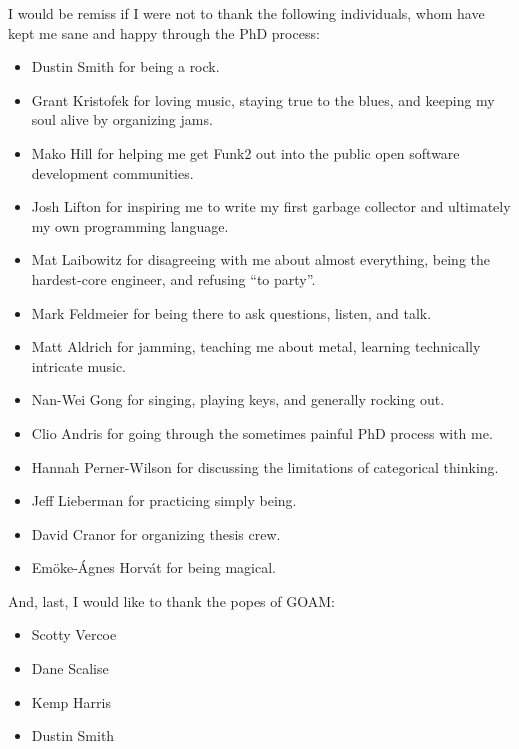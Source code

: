 \vspace{5mm}

I would be remiss if I were not to thank the following individuals,
whom have kept me sane and happy through the PhD process:
\begin{itemize}
\item{Dustin Smith for being a rock.}
\item{Grant Kristofek for loving music, staying true to the blues, and keeping my soul alive by organizing jams.}
\item{Mako Hill for helping me get Funk2 out into the public open software development communities.}
\item{Josh Lifton for inspiring me to write my first garbage collector and ultimately my own programming language.}
\item{Mat Laibowitz for disagreeing with me about almost everything, being the hardest-core engineer, and refusing ``to party''.}
\item{Mark Feldmeier for being there to ask questions, listen, and talk.}
\item{Matt Aldrich for jamming, teaching me about metal, learning technically intricate music.}
\item{Nan-Wei Gong for singing, playing keys, and generally rocking out.}
\item{Clio Andris for going through the sometimes painful PhD process with me.}
\item{Hannah Perner-Wilson for discussing the limitations of categorical thinking.}
\item{Jeff Lieberman for practicing simply being.}
\item{David Cranor for organizing thesis crew.}
\item{Em\"{o}ke-\'{A}gnes Horv\'{a}t for being magical.}
\end{itemize}

\vspace{5mm}

And, last, I would like to thank the popes of GOAM:
\begin{itemize}
\item{Scotty Vercoe}
\item{Dane Scalise}
\item{Kemp Harris}
\item{Dustin Smith}
\end{itemize}

\endgroup

